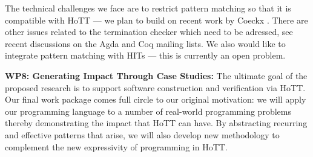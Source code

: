 \documentclass[a4paper,11pt]{article}
\begin{document}
The technical challenges we face are to restrict pattern matching so
that it is compatible with HoTT --- we plan to build on recent work
by Coeckx \cite{coeckx-without-k}. There are other issues
related to the termination checker which need to be adressed, 
see recent discussions on the Agda and Coq mailing lists.
We also would like to integrate pattern
matching with HITs --- this is currently an open problem. 







{\bf WP8: Generating Impact Through Case Studies:} The ultimate goal
of the proposed research is to support software construction and
verification via HoTT. Our final work package comes full circle to our
original motivation: we will apply our programming language to a
number of real-world programming problems thereby demonstrating the
impact that HoTT can have. By abstracting recurring and effective
patterns that arise, we will also develop new methodology to
complement the new expressivity of programming in HoTT.
\end{document}
